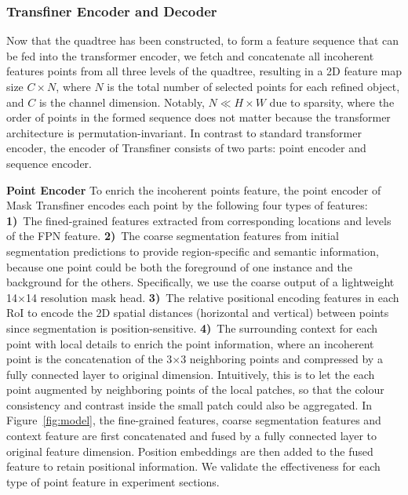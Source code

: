 \documentclass[10pt,twocolumn,letterpaper]{article}
\newcommand{\parsection}[1]{\vspace{1mm}\noindent\textbf{#1}}
\begin{document}
\subsubsection{Transfiner Encoder and Decoder} 
Now that the quadtree has been constructed, to form a feature sequence that can be fed into the transformer encoder, we fetch and concatenate all incoherent features points from all three levels of the quadtree, resulting in a 2D feature map size $C \times N$, where $N$ is the total number of selected points for each refined object, and $C$ is the channel dimension. Notably, $N \ll H\times W$ due to  sparsity, where the order of points in the formed sequence does not matter because the transformer architecture is permutation-invariant. In contrast to standard transformer encoder, the encoder of Transfiner consists of two parts: point encoder and sequence encoder.

\parsection{Point Encoder} 
To enrich the incoherent points feature, the point encoder of Mask Transfiner encodes each point by the following four types of features: \textbf{1)}~The fined-grained features extracted from corresponding locations and levels of the FPN feature. \textbf{2)}~The coarse segmentation features from initial segmentation predictions to provide region-specific and semantic information, because one point could be both the foreground of one instance and the background for the others. Specifically, we use the coarse output of a lightweight 14$\times$14 resolution mask head. \textbf{3)}~The relative positional encoding features in each RoI to encode the 2D spatial distances (horizontal and vertical) between points since segmentation is position-sensitive. \textbf{4)}~The surrounding context for each point with local details to enrich the point information, where an incoherent point is the concatenation of the 3$\times$3 neighboring points and compressed by a fully connected layer to original dimension. Intuitively, this is to let the each point augmented by neighboring points of the local patches, so that the colour consistency and contrast inside the small patch could also be aggregated. In Figure~\ref{fig:model}, the fine-grained features, coarse segmentation features and context feature are first concatenated and fused by a fully connected layer to original feature dimension. Position embeddings are then added to the fused feature to retain positional information. We validate the effectiveness for each type of point feature in experiment sections. 
\end{document}
